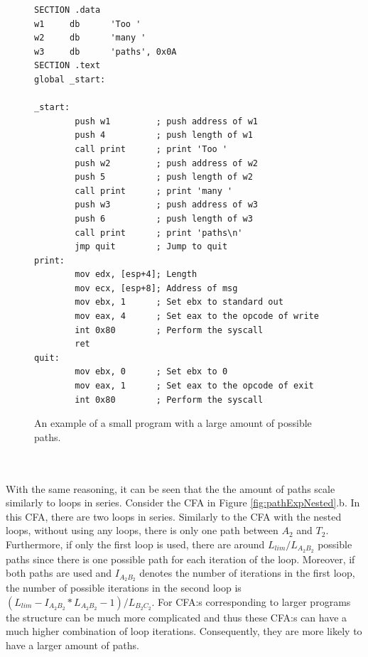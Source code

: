 \documentclass{kththesis}
\begin{document}
\begin{figure}[!t]
    \centering
\begin{tcolorbox}
\begin{verbatim}
SECTION .data
w1     db      'Too '
w2     db      'many '
w3     db      'paths', 0x0A
SECTION .text
global _start:

_start:
        push w1         ; push address of w1
        push 4          ; push length of w1
        call print      ; print 'Too '
        push w2         ; push address of w2
        push 5          ; push length of w2
        call print      ; print 'many '
        push w3         ; push address of w3
        push 6          ; push length of w3
        call print      ; print 'paths\n'
        jmp quit        ; Jump to quit
print:
        mov edx, [esp+4]; Length
        mov ecx, [esp+8]; Address of msg
        mov ebx, 1      ; Set ebx to standard out
        mov eax, 4      ; Set eax to the opcode of write
        int 0x80        ; Perform the syscall
        ret
quit:
        mov ebx, 0      ; Set ebx to 0
        mov eax, 1      ; Set eax to the opcode of exit
        int 0x80        ; Perform the syscall
\end{verbatim}
\end{tcolorbox}
\caption{An example of a small program with a large amount of possible paths.}
    \label{fig:pathExpProg}
\end{figure}
\\ \\
With the same reasoning, it can be seen that the the amount of paths scale similarly to loops in series. Consider the CFA in Figure \ref{fig:pathExpNested}.b. In this CFA, there are two loops in series. Similarly to the CFA with the nested loops, without using any loops, there is only one path between $A_2$ and $T_2$. Furthermore, if only the first loop is used, there are around $L_{lim}/L_{A_2B_2}$ possible paths since there is one possible path for each iteration of the loop. Moreover, if both paths are used and $I_{A_2B_2}$ denotes the number of iterations in the first loop, the number of possible iterations in the second loop is $(L_{lim}-I_{A_2B_2}*L_{A_2B_2}-1)/L_{B_2C_2}$. For CFA:s corresponding to larger programs the structure can be much more complicated and thus these CFA:s can have a much higher combination of loop iterations. Consequently, they are more likely to have a larger amount of paths.
\end{document}
